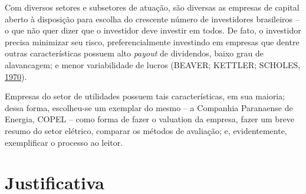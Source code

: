 \documentclass[aprovado,numbers]{coppe}
\begin{document}
  Com diversos setores e subsetores de atuação, são diversas as empresas de capital aberto à disposição para escolha do crescente número de investidores brasileiros -- o que não quer dizer que o investidor deve investir em todos. De fato, o investidor precisa minimizar seu risco, preferencialmente investindo em empresas que dentre outras características possuem alto \emph{payout} de dividendos, baixo grau de alavancagem; e menor variabilidade de lucros (BEAVER; KETTLER; SCHOLES, \protect\hyperlink{ref-beaver1970}{1970}).

  Empresas do setor de utilidades possuem tais características, em sua maioria; dessa forma, escolheu-se um exemplar do mesmo -- a Companhia Paranaense de Energia, COPEL -- como forma de fazer o valuation da empresa, fazer um breve resumo do setor elétrico, comparar os métodos de avaliação; e, evidentemente, exemplificar o processo ao leitor.

  \hypertarget{justificativa}{%
  \section{Justificativa}\label{justificativa}}
\end{document}
